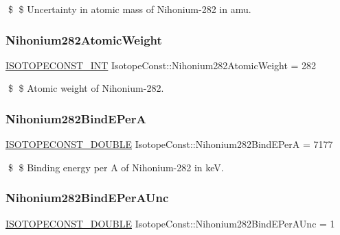 \$ \$ Uncertainty in atomic mass of Nihonium-\/282 in amu. \mbox{\label{group___isotope_const-_nihonium-_nh282_gaac89422de27454feda4840fe130d560c}} 
\subsubsection{\texorpdfstring{Nihonium282\+Atomic\+Weight}{Nihonium282AtomicWeight}}
{\footnotesize\ttfamily \mbox{\hyperlink{group___isotope_const-_macros_ga5f18360b3e99483a35c32d789e62621c}{I\+S\+O\+T\+O\+P\+E\+C\+O\+N\+S\+T\+\_\+\+I\+NT}} Isotope\+Const\+::\+Nihonium282\+Atomic\+Weight = 282}

\$ \$ Atomic weight of Nihonium-\/282. \mbox{\label{group___isotope_const-_nihonium-_nh282_ga0f8afab0bd4e46c1a65f723a81c63d7d}} 
\subsubsection{\texorpdfstring{Nihonium282\+Bind\+E\+PerA}{Nihonium282BindEPerA}}
{\footnotesize\ttfamily \mbox{\hyperlink{group___isotope_const-_macros_ga8f45a7272ce02c0b4c65c44636ed719a}{I\+S\+O\+T\+O\+P\+E\+C\+O\+N\+S\+T\+\_\+\+D\+O\+U\+B\+LE}} Isotope\+Const\+::\+Nihonium282\+Bind\+E\+PerA = 7177}

\$ \$ Binding energy per A of Nihonium-\/282 in keV. \mbox{\label{group___isotope_const-_nihonium-_nh282_ga002b725a88740f5b4418b93aab1e0283}} 
\subsubsection{\texorpdfstring{Nihonium282\+Bind\+E\+Per\+A\+Unc}{Nihonium282BindEPerAUnc}}
{\footnotesize\ttfamily \mbox{\hyperlink{group___isotope_const-_macros_ga8f45a7272ce02c0b4c65c44636ed719a}{I\+S\+O\+T\+O\+P\+E\+C\+O\+N\+S\+T\+\_\+\+D\+O\+U\+B\+LE}} Isotope\+Const\+::\+Nihonium282\+Bind\+E\+Per\+A\+Unc = 1}

